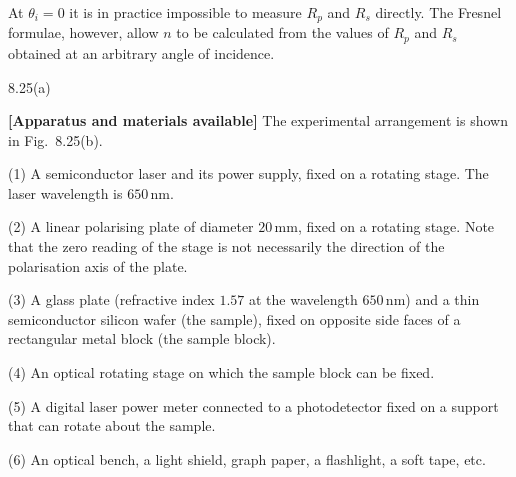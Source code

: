 At $\theta_i=0$ it is in practice impossible to measure $R_p$ and $R_s$ directly. The Fresnel formulae, however, allow $n$ to be calculated from the values of $R_p$ and $R_s$ obtained at an arbitrary angle of incidence.

\begin{figbox}{8.25(a)}
\end{figbox}

\textbf{[Apparatus and materials available]} The experimental arrangement is shown in Fig.~8.25(b).

(1) A semiconductor laser and its power supply, fixed on a rotating stage. The laser wavelength is $650\,\mathrm{nm}$.

(2) A linear polarising plate of diameter $20\,\mathrm{mm}$, fixed on a rotating stage. Note that the zero reading of the stage is not necessarily the direction of the polarisation axis of the plate.

(3) A glass plate (refractive index $1.57$ at the wavelength $650\,\mathrm{nm}$) and a thin semiconductor silicon wafer (the sample), fixed on opposite side faces of a rectangular metal block (the sample block).

(4) An optical rotating stage on which the sample block can be fixed.

(5) A digital laser power meter connected to a photodetector fixed on a support that can rotate about the sample.

(6) An optical bench, a light shield, graph paper, a flashlight, a soft tape, etc.

